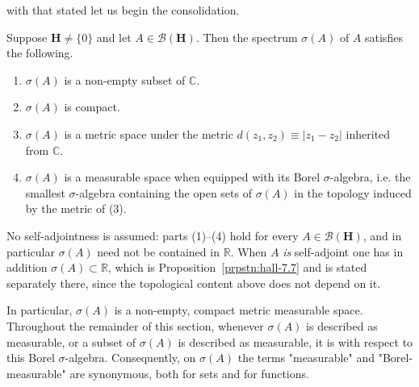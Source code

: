 with that stated let us begin the consolidation.

\begin{lemma}
    \label{lmm:spectrum-is-compact-metric-measurable}
    \leanok
    Suppose $\mathbf{H} \ne \{0\}$ and let $A \in \mathcal{B}(\mathbf{H})$. Then the spectrum $\sigma(A)$ of $A$ satisfies the following.
    \begin{enumerate}
        \item $\sigma(A)$ is a non-empty subset of $\mathbb{C}$.
        \item $\sigma(A)$ is compact.
        \item $\sigma(A)$ is a metric space under the metric $d(z_1, z_2) \equiv \lvert z_1 - z_2 \rvert$ inherited from $\mathbb{C}$.
        \item $\sigma(A)$ is a measurable space when equipped with its Borel $\sigma$-algebra, i.e. the smallest $\sigma$-algebra containing the open sets of $\sigma(A)$ in the topology induced by the metric of (3).
    \end{enumerate}
    No self-adjointness is assumed: parts (1)–(4) hold for every $A \in \mathcal{B}(\mathbf{H})$, and in particular $\sigma(A)$ need not be contained in $\mathbb{R}$. When $A$ \textit{is} self-adjoint one has in addition $\sigma(A) \subset \mathbb{R}$, which is Proposition~\ref{prpstn:hall-7.7} and is stated separately there, since the topological content above does not depend on it.

    In particular, $\sigma(A)$ is a non-empty, compact metric measurable space. Throughout the remainder of this section, whenever $\sigma(A)$ is described as measurable, or a subset of $\sigma(A)$ is described as measurable, it is with respect to this Borel $\sigma$-algebra. Consequently, on $\sigma(A)$ the terms "measurable" and "Borel-measurable" are synonymous, both for sets and for functions.
\end{lemma}
